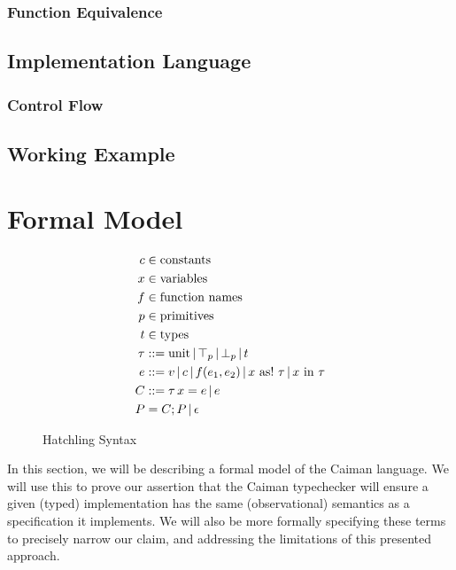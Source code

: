 \subsubsection{Function Equivalence}

\subsection{Implementation Language}

\subsubsection{Control Flow}

\subsection{Working Example}

\section{Formal Model}

\begin{figure}
\begin{align*}
	c &\in\text{constants}\\
	x &\in\text{variables}\\
	f &\in \text{function names}\\
	p &\in\text{primitives}\\
	t &\in\text{types} \\
	\tau &\defas \textrm{unit} \,|\, \top_p \,|\, \bot_p \,|\, t \\
	e &\defas v \,|\, c \,|\, f(e_1, e_2) \,|\, x\ \textrm{as!}\ \tau \,|\, x\ \textrm{in}\ \tau\\
	C &\defas \tau \, x = e \,|\, e\\
	P  &=  C;P \,|\, \epsilon\\
\end{align*}
\caption{Hatchling Syntax}
\label{fig:syntax}
\end{figure}

In this section, we will be describing a formal model of the Caiman language. We will use this to prove our assertion that the Caiman typechecker will ensure a given (typed) implementation has the same (observational) semantics as a specification it implements.  We will also be more formally specifying these terms to precisely narrow our claim, and addressing the limitations of this presented approach.

